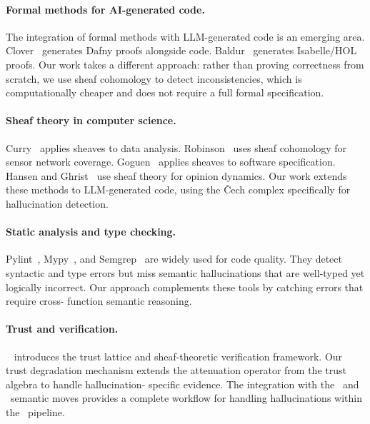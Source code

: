 \documentclass[11pt]{article}
\begin{document}
\paragraph{Formal methods for AI-generated code.}
The integration of formal methods with LLM-generated code is an
emerging area.  Clover~\cite{Sun2024clover} generates Dafny proofs
alongside code.  Baldur~\cite{First2023baldur} generates Isabelle/HOL
proofs.  Our work takes a different approach: rather than proving
correctness from scratch, we use sheaf cohomology to detect
inconsistencies, which is computationally cheaper and does not
require a full formal specification.

\paragraph{Sheaf theory in computer science.}
Curry~\cite{Curry2014sheaves} applies sheaves to data analysis.
Robinson~\cite{Robinson2014topological} uses sheaf cohomology for
sensor network coverage.  Goguen~\cite{Goguen1992sheaf} applies
sheaves to software specification.  Hansen and
Ghrist~\cite{Hansen2019opinion} use sheaf theory for opinion
dynamics.  Our work extends these methods to LLM-generated code,
using the \v{C}ech complex specifically for hallucination detection.

\paragraph{Static analysis and type checking.}
Pylint~\cite{Pylint}, Mypy~\cite{Mypy}, and
Semgrep~\cite{Semgrep} are widely used for code quality.  They
detect syntactic and type errors but miss semantic hallucinations
that are well-typed yet logically incorrect.  Our approach
complements these tools by catching errors that require cross-
function semantic reasoning.

\paragraph{Trust and verification.}
\JuGeo~\cite{JuGeo2023} introduces the trust lattice and sheaf-theoretic
verification framework.  Our trust degradation mechanism extends the
attenuation operator from the trust algebra to handle hallucination-
specific evidence.  The integration with the \REPAIR\ and \PROMOTE\
semantic moves provides a complete workflow for handling hallucinations
within the \JuGeo\ pipeline.


\end{document}
